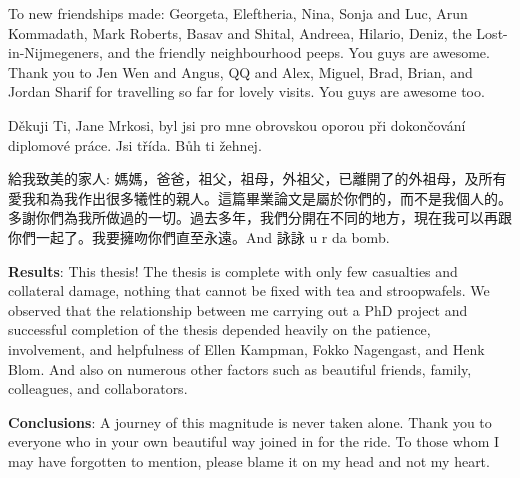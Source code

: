\noindent To new friendships made: Georgeta, Eleftheria, Nina, Sonja and Luc, Arun Kommadath, Mark Roberts, Basav and Shital, Andreea, Hilario, Deniz, the Lost-in-Nijmegeners, and the friendly neighbourhood peeps. You guys are awesome. Thank you to Jen Wen and Angus, QQ and Alex, Miguel, Brad, Brian, and Jordan Sharif for travelling so far for lovely visits. You guys are awesome too.

\noindent D{\v e}kuji Ti, Jane Mrkosi, byl jsi pro mne obrovskou oporou p{\v r}i dokon{\v c}ov{\' a}n{\' i} diplomov{\' e} pr{\' a}ce. Jsi t{\v r}{\' i}da. B\r{u}h ti {\v z}ehnej.

\noindent
\begin{CJK}{UTF8}{bsmi}給我致美的家人: 媽媽，爸爸，祖父，祖母，外祖父，已離開了的外祖母，及所有愛我和為我作出很多犧性的親人。這篇畢業論文是屬於你們的，而不是我個人的。多謝你們為我所做過的一切。過去多年，我們分開在不同的地方，現在我可以再跟你們一起了。我要擁吻你們直至永遠。And 詠詠 u r da bomb.
\end{CJK}

\noindent \textbf{Results}: This thesis! The thesis is complete with only few casualties and collateral damage, nothing that cannot be fixed with tea and stroopwafels. We observed that the relationship between me carrying out a PhD project and successful completion of the thesis depended heavily on the patience, involvement, and helpfulness of Ellen Kampman, Fokko Nagengast, and Henk Blom. And also on numerous other factors such as beautiful friends, family, colleagues, and collaborators.

\noindent \textbf{Conclusions}: A journey of this magnitude is never taken alone. Thank you to everyone who in your own beautiful way joined in for the ride. To those whom I may have forgotten to mention, please blame it on my head and not my heart.